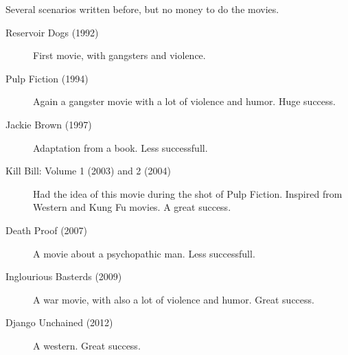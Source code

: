 \documentclass[a4paper,12pt]{article}
\begin{document}
Several scenarios written before, but no money to do the movies.

\begin{description}
    \item[Reservoir Dogs (1992)] First movie, with gangsters and violence.
    \item[Pulp Fiction (1994)] Again a gangster movie with a lot of violence and humor. Huge success.
    \item[Jackie Brown (1997)] Adaptation from a book. Less successfull.
    \item[Kill Bill: Volume 1 (2003) and 2 (2004)] Had the idea of this movie during the shot of Pulp Fiction. Inspired from Western and Kung Fu movies. A great success.
    \item[Death Proof (2007)] A movie about a psychopathic man. Less successfull.
    \item[Inglourious Basterds (2009)] A war movie, with also a lot of violence and humor. Great success.
    \item[Django Unchained (2012)] A western. Great success.
\end{description}
\end{document}
